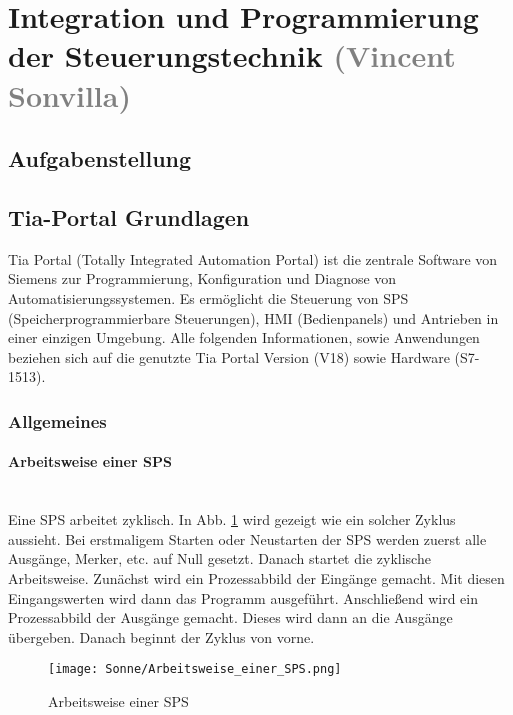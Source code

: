 \section{Integration und Programmierung der Steuerungstechnik \textcolor{gray}{ (Vincent Sonvilla)}}


\subsection{Aufgabenstellung}


\subsection{Tia-Portal Grundlagen}

Tia Portal (Totally Integrated Automation Portal) ist die zentrale Software von Siemens zur Programmierung, Konfiguration und Diagnose von Automatisierungssystemen. Es ermöglicht die Steuerung von SPS (Speicherprogrammierbare Steuerungen), HMI (Bedienpanels) und Antrieben in einer einzigen Umgebung. Alle folgenden Informationen, sowie Anwendungen beziehen sich auf die genutzte Tia Portal Version (V18) sowie Hardware (S7-1513).

    \subsubsection{Allgemeines}

        \paragraph{Arbeitsweise einer SPS} \mbox{} \\
        Eine SPS arbeitet zyklisch. In Abb. \ref{Arbeitsweise_einer_SPS} wird gezeigt wie ein solcher Zyklus aussieht. Bei erstmaligem Starten oder Neustarten der SPS werden zuerst alle Ausgänge, Merker, etc. auf Null gesetzt. Danach startet die zyklische Arbeitsweise. Zunächst wird ein Prozessabbild der Eingänge gemacht. Mit diesen Eingangswerten wird dann das Programm ausgeführt. Anschließend wird ein Prozessabbild der Ausgänge gemacht. Dieses wird dann an die Ausgänge übergeben. Danach beginnt der Zyklus von vorne. \cite{Arbeitsweise_der_SPS}
        \begin{figure}[h]
            \texttt{[image: Sonne/Arbeitsweise\_einer\_SPS.png]}
            \caption{Arbeitsweise einer SPS \cite{Arbeitsweise_der_SPS}}
            \label{Arbeitsweise_einer_SPS}
        \end{figure}



